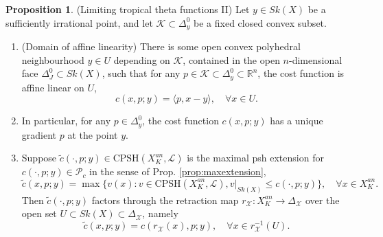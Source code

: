 \documentclass[a4paper]{article}
\theoremstyle{definition}
\newtheorem{prop}[thm]{Proposition}
\newcommand{\R}{\mathbb{R}}
\begin{document}
	
	\begin{prop}\label{prop:limitingtropicalthetafromp2} 
	(Limiting tropical theta functions II) 	Let $y\in Sk(X)$ be a sufficiently irrational point, and let  $\mathcal{K}\subset \Delta_y^0$ be a fixed closed convex subset. 
	\begin{enumerate}
		\item (Domain of affine linearity) There is some open convex polyhedral neighbourhood $ y\in U$  depending on $\mathcal{K}$, contained in the open $n$-dimensional face $\Delta_J^0\subset Sk(X)$, such that for any $p\in \mathcal{K}\subset \Delta_y^0\subset \R^n$, the cost function is affine linear on $U$,
		\[
		c(x,p;y)= \langle p, x-y\rangle ,\quad \forall x\in U.
		\]
		
		
		
		\item In particular, for any $p\in \Delta_y^0$, the cost function $c(x,p;y)$ has a unique gradient $p$ at the point $y$.
		
		
		
\item   Suppose $\tilde{c}(\cdot ,p;y)\in \text{CPSH}(X_K^{an},\mathcal{L})$ is the maximal psh  extension for $c(\cdot,p;y)\in \mathcal{P}_c$ in the sense of Prop. \ref{prop:maxextension},
\[
\tilde{c}(x,p;y)= \max\{ v(x) :v\in \text{CPSH}(X_K^{an},\mathcal{L}), v|_{Sk(X)}\leq c(\cdot,p;y) \},\quad \forall x\in X_K^{an}.
\]
Then $\tilde{c}(\cdot, p;y)$ factors through the retraction map $r_\mathcal{X}: X_K^{an}\to \Delta_{\mathcal{X}}$ over the open set $U\subset  Sk(X)\subset \Delta_{\mathcal{X}}$, namely
\[
\tilde{c}(x, p;y)= c(   r_{\mathcal{X}}(x), p; y  ),\quad \forall x\in r_{\mathcal{X}}^{-1}(U).
\]




	\end{enumerate}
	\end{prop}
	
	
	
\end{document}
